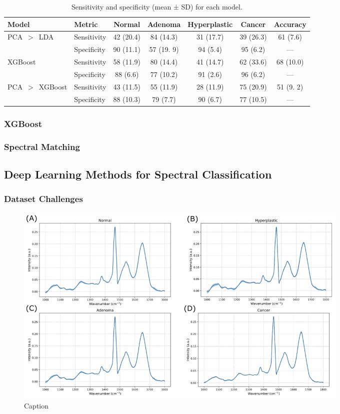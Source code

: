 \begin{table}[ht] \centering \caption{Sensitivity and specificity (mean ± SD)
for each model.} \label{tab:model_performance} \begin{tabular}{@{}l l c c c c
c@{}} \toprule Model & Metric & Normal & Adenoma & Hyperplastic & Cancer &
Accuracy \\ \midrule \multirow{2}{*}{PCA~$>$~LDA} & Sensitivity & 42 (20.4) & 84
(14.3) & 31 (17.7) & 39 (26.3) & 61 (7.6) \\ & Specificity & 90 (11.1) & 57 (19.
9) & 94 (5.4) & 95 (6.2) & — \\ \midrule \multirow{2}{*}{XGBoost} & Sensitivity
& 58 (11.9) & 80 (14.4) & 41 (14.7) & 62 (33.6) & 68 (10.0) \\ & Specificity &
88 (6.6) & 77 (10.2) & 91 (2.6) & 96 (6.2) & — \\ \midrule \multirow{2}{*}{PCA~$>$~XGBoost} & Sensitivity & 43 (11.5) & 55 (11.9) & 28 (11.9) & 75 (20.9) & 51 (9.
2) \\ & Specificity & 88 (10.3) & 79 (7.7) & 90 (6.7) & 77 (10.5) & — \\
\bottomrule \end{tabular} \end{table}


\subsubsection{XGBoost}
\subsubsection{Spectral Matching}


\subsection{Deep Learning Methods for Spectral Classification}
\subsubsection{Dataset Challenges}
\begin{figure}[htbp]
  \centering
  \includegraphics[width=0.8\textwidth]{Images/Dataset_Class_Differences.png}
  \caption{Caption}
  \label{fig:my-label}
\end{figure}

